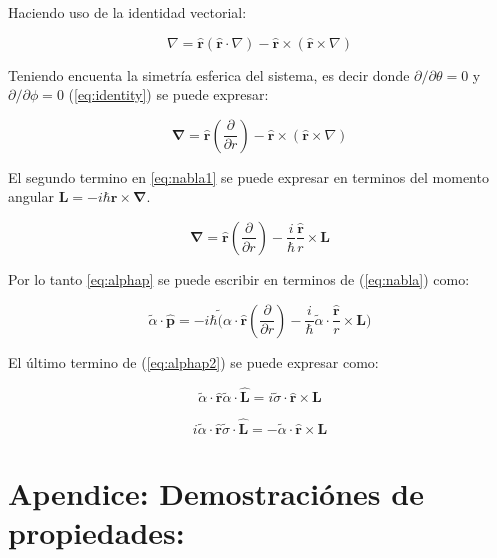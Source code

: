 \documentclass[a4paper, 12pt]{article} %
\begin{document}
Haciendo uso de la identidad vectorial: 

\begin{equation}\label{eq:identity}
\nabla = \hat{\mathbf{r}}(\hat{\mathbf{r}}\cdot \nabla) - \hat{\mathbf{r}} \times (\hat{\mathbf{r}} \times \nabla)  
\end{equation}

Teniendo encuenta la simetr\'ia esferica del sistema, es decir donde $\partial/\partial \theta = 0$
y $\partial/\partial \phi = 0$  (\ref{eq:identity}) se puede expresar:

\begin{equation}\label{eq:nabla1}
\mathbf\nabla = \hat{\mathbf{r}}(\dfrac{\partial}{\partial r}) - \hat{\mathbf{r}} \times (\hat{\mathbf{r}} \times \nabla)
\end{equation}

El segundo termino en \ref{eq:nabla1} se puede expresar en terminos del momento angular $\mathbf{L} = -i\hbar \mathbf{r} \times \mathbf{\nabla}$.

\begin{equation}\label{eq:nabla}
\mathbf{\nabla} =  \hat{\mathbf{r}}(\dfrac{\partial}{\partial r}) - \dfrac{i}{\hbar}\dfrac{\hat{\mathbf{r}}}{r} \times \mathbf{L}
\end{equation}

Por lo tanto \ref{eq:alphap} se puede escribir en terminos de (\ref{eq:nabla}) como:

\begin{equation}\label{eq:alphap2}
\widetilde{\alpha}\cdot \mathbf{\hat{p}} = -i\hbar \widetilde({\alpha}\cdot \hat{\mathbf{r}}(\dfrac{\partial}{\partial r}) - 
\dfrac{i}{\hbar}\widetilde{\alpha}\cdot \dfrac{\hat{\mathbf{r}}}{r} \times \mathbf{L})
\end{equation}

El \'ultimo termino de (\ref{eq:alphap2}) se puede expresar como:

\begin{equation}
\widetilde{\alpha}\cdot\hat{\mathbf{r}}\widetilde{\alpha} \cdot \hat{\mathbf{L}} = i\widetilde{\sigma}\cdot \hat{\mathbf{r}} \times \mathbf{L}
\end{equation}

\begin{equation}
i\widetilde{\alpha}\cdot\hat{\mathbf{r}}\widetilde{\sigma} \cdot \hat{\mathbf{L}} = -\widetilde{\alpha}\cdot \hat{\mathbf{r}} \times \mathbf{L}
\end{equation}

\section*{Apendice: Demostraci\'ones de propiedades:}
\end{document}
